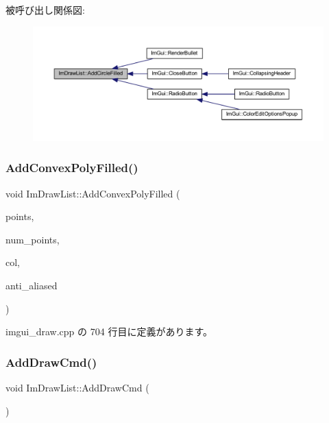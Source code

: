 被呼び出し関係図\+:\nopagebreak
\begin{figure}[H]
\begin{center}
\leavevmode
\includegraphics[width=350pt]{struct_im_draw_list_a293e87d22e17587e3994cf6deb20be45_icgraph}
\end{center}
\end{figure}
\mbox{\label{struct_im_draw_list_a3ba618d0615e410dce9eaa0b80a30126}} 
\subsubsection{\texorpdfstring{Add\+Convex\+Poly\+Filled()}{AddConvexPolyFilled()}}
{\footnotesize\ttfamily void Im\+Draw\+List\+::\+Add\+Convex\+Poly\+Filled (\begin{DoxyParamCaption}\item[{const \mbox{\hyperlink{struct_im_vec2}{Im\+Vec2}} $\ast$}]{points,  }\item[{const int}]{num\+\_\+points,  }\item[{\mbox{\hyperlink{imgui_8h_a118cff4eeb8d00e7d07ce3d6460eed36}{Im\+U32}}}]{col,  }\item[{bool}]{anti\+\_\+aliased }\end{DoxyParamCaption})}



 imgui\+\_\+draw.\+cpp の 704 行目に定義があります。

\mbox{\label{struct_im_draw_list_a846714bb0321c6f1f908767abc8559e6}} 
\subsubsection{\texorpdfstring{Add\+Draw\+Cmd()}{AddDrawCmd()}}
{\footnotesize\ttfamily void Im\+Draw\+List\+::\+Add\+Draw\+Cmd (\begin{DoxyParamCaption}{ }\end{DoxyParamCaption})}



